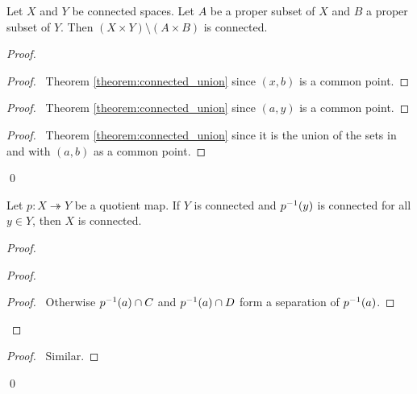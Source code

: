 \begin{proposition}
    Let $X$ and $Y$ be connected spaces. Let $A$ be a proper subset of $X$ and $B$ a proper subset of $Y$. Then $(X \times Y) \setminus (A \times B)$ is connected.
\end{proposition}

\begin{proof}
    \pf
    \begin{proof}
        \pf\ Theorem \ref{theorem:connected_union} since $(x,b)$ is a common point.
    \end{proof}
    \begin{proof}
        \pf\ Theorem \ref{theorem:connected_union} since $(a,y)$ is a common point.
    \end{proof}
    \begin{proof}
        \pf\ Theorem \ref{theorem:connected_union} since it is the union of the sets in  and  with $(a,b)$ as a common point.
    \end{proof}
    \qed
\end{proof}

\begin{proposition}
    Let $p : X \twoheadrightarrow Y$ be a quotient map. If $Y$ is connected and ${p}^{-1}(y)$ is connected for all $y \in Y$, then $X$ is connected.
\end{proposition}

\begin{proof}
    \pf
    \begin{proof}
        \begin{proof}
            \pf\ Otherwise ${p}^{-1}(a) \cap C$ and ${p}^{-1}(a) \cap D$ form a separation of ${p}^{-1}(a)$.
        \end{proof}
    \end{proof}
    \begin{proof}
        \pf\ Similar.
    \end{proof}
    \qed
\end{proof}

